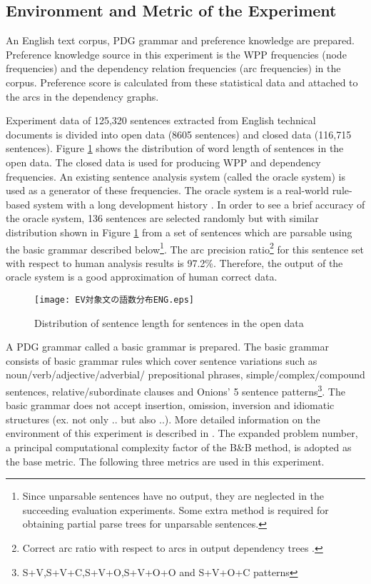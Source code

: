 \subsection{Environment and Metric of the Experiment}

An English text corpus, PDG grammar and preference
knowledge are prepared. Preference knowledge source in this
experiment is the WPP frequencies (node frequencies) and the
dependency relation frequencies (arc frequencies) in the
corpus. Preference score is calculated from these statistical data and
attached to the arcs in the dependency graphs. 

Experiment data of 125,320 sentences extracted from English technical
documents is divided into open data (8605 sentences) and closed data
(116,715 sentences). Figure \ref{fig:SentenceDistribution} shows the
distribution of word length of sentences in the open data. The closed
data is used for producing WPP and dependency frequencies. An existing
sentence analysis system (called the oracle system) is used as a
generator of these frequencies. The oracle system is a real-world
rule-based system with a long development history
\cite{Amano89,Hirakawa00}. In order to see a brief accuracy of the
oracle system, 136 sentences are selected randomly but with similar
distribution shown in Figure \ref{fig:SentenceDistribution} from a set
of sentences which are parsable using the basic grammar described
below\footnote{Since unparsable sentences have no output, they are
neglected in the succeeding evaluation experiments. Some extra method
is required for obtaining partial parse trees for unparsable
sentences.}. The arc precision ratio\footnote{Correct arc ratio with
respect to arcs in output dependency trees \cite{Hirakawa05b}.} for
this sentence set with respect to human analysis results is
97.2\%. Therefore, the output of the oracle system is a good
approximation of human correct data.

\begin{figure}[t]
\myfiglabelskippre
 \begin{center}
     \texttt{[image: EV対象文の語数分布ENG.eps]}
 \end{center}
\myfiglabelskippre
\caption{Distribution of sentence length for sentences in the open data}
\label{fig:SentenceDistribution}
\myfiglabelskippre
\end{figure}

A PDG grammar called a basic grammar is prepared. The basic grammar
consists of basic grammar rules which cover sentence variations such
as noun/verb/adjective/adverbial/ prepositional phrases,
simple/complex/compound sentences, relative/subordinate clauses and
Onions' 5 sentence patterns\footnote{S+V,S+V+C,S+V+O,S+V+O+O and
S+V+O+C patterns}. The basic grammar does not accept insertion,
omission, inversion and idiomatic structures (ex. not only .. but also
..). More detailed information on the environment of this experiment
is described in \cite{Hirakawa05b}.  The expanded problem number, a
principal computational complexity factor of the B\&B method, is adopted as the
base metric. The following three metrics are used in
this experiment.

